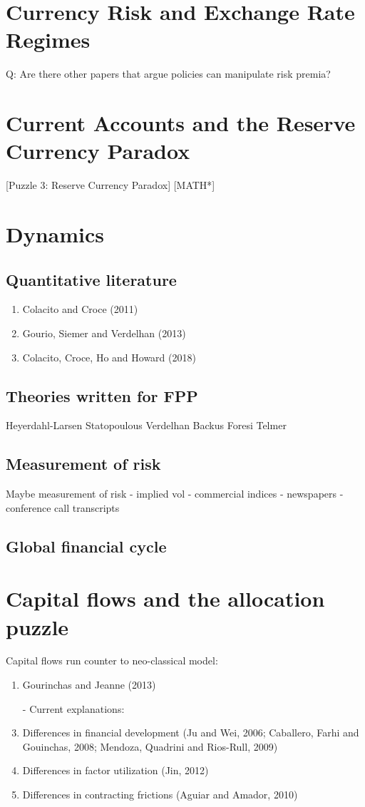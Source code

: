 \documentclass[12pt,letter]{article}
\theoremstyle{break} \theorembodyfont{\normalfont\itshape}
\theoremstyle{break}
\theoremstyle{break} \theorembodyfont{\normalfont\itshape}
\theoremstyle{break} \theorembodyfont{\normalfont\itshape}
\begin{document}
\section{Currency Risk and Exchange Rate Regimes}
Q: Are there other papers that argue policies can manipulate risk
premia?

\section{Current Accounts and the Reserve Currency Paradox}
 [Puzzle 3: Reserve Currency Paradox]
 [MATH*]

\section{Dynamics}
\subsection{Quantitative literature}
\begin{enumerate}
\item Colacito and Croce (2011)
\item Gourio, Siemer and Verdelhan (2013)
\item Colacito, Croce, Ho and Howard (2018)
\end{enumerate}
\subsection{Theories written for FPP}
Heyerdahl-Larsen Statopoulous Verdelhan Backus Foresi Telmer
\subsection{Measurement of risk}
Maybe measurement of risk - implied vol - commercial indices -
newspapers - conference call transcripts
\subsection{Global financial cycle}

\section{Capital flows and the allocation puzzle}
Capital flows run counter to neo-classical model:
\begin{enumerate}
\item Gourinchas and Jeanne (2013)
\item[-] Current explanations:
\item Differences in financial development (Ju and Wei, 2006;
  Caballero, Farhi and Gouinchas, 2008; Mendoza, Quadrini and
  Rios-Rull, 2009)
\item Differences in factor utilization (Jin, 2012)
\item Differences in contracting frictions (Aguiar and Amador, 2010)
\end{enumerate}
\end{document}
